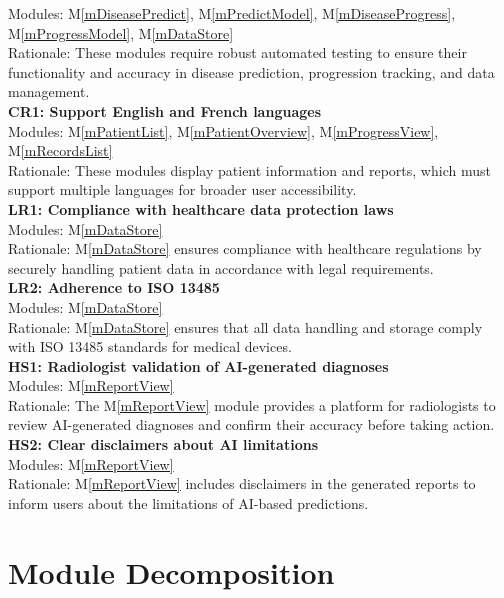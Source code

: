 \documentclass[12pt, titlepage]{article}
\newcommand{\mref}[1]{M\ref{#1}}
\begin{document}
Modules: \mref{mDiseasePredict}, \mref{mPredictModel}, \mref{mDiseaseProgress}, \mref{mProgressModel}, \mref{mDataStore} \\
Rationale: These modules require robust automated testing to ensure their functionality and accuracy in disease prediction, progression tracking, and data management. \\
\newline
\textbf{CR1: Support English and French languages} \\
Modules: \mref{mPatientList}, \mref{mPatientOverview}, \mref{mProgressView}, \mref{mRecordsList} \\
Rationale: These modules display patient information and reports, which must support multiple languages for broader user accessibility. \\
\newline
\textbf{LR1: Compliance with healthcare data protection laws} \\
Modules: \mref{mDataStore} \\
Rationale: \mref{mDataStore} ensures compliance with healthcare regulations by securely handling patient data in accordance with legal requirements. \\
\newline
\textbf{LR2: Adherence to ISO 13485} \\
Modules: \mref{mDataStore} \\
Rationale: \mref{mDataStore} ensures that all data handling and storage comply with ISO 13485 standards for medical devices. \\
\newline
\textbf{HS1: Radiologist validation of AI-generated diagnoses} \\
Modules: \mref{mReportView} \\
Rationale: The \mref{mReportView} module provides a platform for radiologists to review AI-generated diagnoses and confirm their accuracy before taking action. \\
\newline
\textbf{HS2: Clear disclaimers about AI limitations} \\
Modules: \mref{mReportView} \\
Rationale: \mref{mReportView} includes disclaimers in the generated reports to inform users about the limitations of AI-based predictions. \\

\section{Module Decomposition} \label{SecMD}
\end{document}
